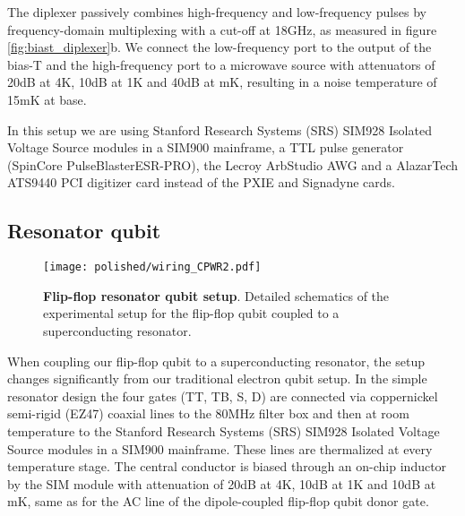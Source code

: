 The diplexer passively combines high-frequency and low-frequency pulses by frequency-domain multiplexing with a cut-off at 18GHz, as measured in figure \ref{fig:biast_diplexer}b. We connect the low-frequency port to the output of the bias-T and the high-frequency port to a microwave source with attenuators of 20dB at 4K, 10dB at 1K and 40dB at mK, resulting in a noise temperature of 15mK at base. %

In this setup we are using Stanford Research Systems (SRS) SIM928 Isolated Voltage Source modules in a SIM900 mainframe, a TTL pulse generator (SpinCore PulseBlasterESR-PRO), the Lecroy ArbStudio AWG and a AlazarTech ATS9440 PCI digitizer card instead of the PXIE and Signadyne cards. 


\subsection{Resonator qubit} \label{sec:setup_res}

\begin{figure}
	\centering
	\texttt{[image: polished/wiring\_CPWR2.pdf]}
	\caption[Flip-flop resonator qubit setup]{\textbf{Flip-flop resonator qubit setup}. Detailed schematics of the experimental setup for the flip-flop qubit coupled to a superconducting resonator.  }
	\label{fig:resonator_setup}
\end{figure}

When coupling our flip-flop qubit to a superconducting resonator, the setup changes significantly from our traditional electron qubit setup. In the simple resonator design the four gates (TT, TB, S, D) are connected via coppernickel semi-rigid (EZ47) coaxial lines to the 80MHz filter box and then at room temperature to the Stanford Research Systems (SRS) SIM928 Isolated Voltage Source modules in a SIM900 mainframe. These lines are thermalized at every temperature stage. 
The central conductor is biased through an on-chip inductor by the SIM module with attenuation of 20dB at 4K, 10dB at 1K and 10dB at mK, same as for the AC line of the dipole-coupled flip-flop qubit donor gate. 

